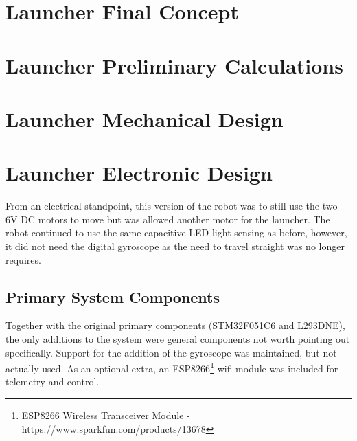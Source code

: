\clearpage
\section{Launcher Final Concept}
\label{sec:Launcher Final Concept}

\clearpage
\section{Launcher Preliminary Calculations}
\label{sec:Launcher Preliminary Calculations}

\clearpage
\section{Launcher Mechanical Design}
\label{sec:Launcher Mechanical Design}

\clearpage
\section{Launcher Electronic Design}
\label{sec:Launcher Electronic Design}
  From an electrical standpoint, this version of the robot was to still use the two 6V DC motors to move but was allowed another motor for the launcher. The robot continued to use the same capacitive LED light sensing as before, however, it did not need the digital gyroscope as the need to travel straight was no longer requires.

  \subsection{Primary System Components}
  \label{sub:Primary System Components}
    Together with the original primary components (STM32F051C6 and L293DNE), the only additions to the system were general components not worth pointing out specifically. Support for the addition of the gyroscope was maintained, but not actually used. As an optional extra, an ESP8266\footnote{ESP8266 Wireless Transceiver Module - https://www.sparkfun.com/products/13678} wifi module was included for telemetry and control.

